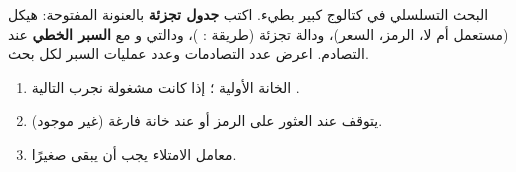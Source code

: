 \begin{statement}
البحث التسلسلي في كتالوج كبير بطيء. اكتب \textbf{جدول تجزئة} بالعنونة المفتوحة: هيكل  (مستعمل أم لا، الرمز، السعر)، ودالة تجزئة  (طريقة : )، ودالتي  و  مع \textbf{السبر الخطي} عند التصادم. اعرض عدد التصادمات وعدد عمليات السبر لكل بحث.
\end{statement}
\begin{stepsbox}\begin{enumerate}
\item الخانة الأولية ؛ إذا كانت مشغولة نجرب التالية .
\item {} يتوقف عند العثور على الرمز أو عند خانة فارغة (غير موجود).
\item معامل الامتلاء  يجب أن يبقى صغيرًا.
\end{enumerate}\end{stepsbox}
